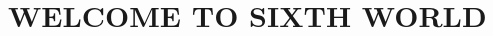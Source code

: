 \documentclass[oneside,10pt]{article}
\begin{document}
\generatePageLayouts{}
\switchToLayoutPageA{}


{
  \fancyhf{}
    \fancyhead{}
    \fancyfoot{}
}	%




\begin{multicols}{2}
\tableofcontents
\end{multicols}

\newcommand{\critterspec}[7]{
\setlength{\parskip}{.1em}
\vspace{.5cm}
\begin{minipage}{\linewidth}
{\large\bfseries #1}

{\itshape #2}

#3

#4\vspace{.25em}
\hrule
\vspace{.25em}
#5 \textit{Instinct:} #6
\begin{adjustwidth*}{.5cm}{.5cm}
#7
\end{adjustwidth*}
\end{minipage}
}


\newpage
\pagestyle{fancy}
\setcounter{page}{1}
\renewcommand{\headrulewidth}{0pt} %
\renewcommand{\footrulewidth}{0pt}
\fancyhf{}
\fancyfoot[RO]{\orbitronfont\fontsize{.5cm}{0em}\selectfont\bfseries\thepage}

\section{WELCOME TO SIXTH WORLD}
\label{introduction}
\end{document}
